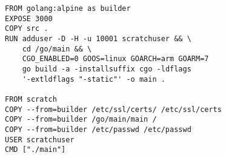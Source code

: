 \lstset{
numbers=left, 
basicstyle=\footnotesize,
frame = single, 
language=Pascal, 
framexleftmargin=16pt,
xleftmargin=2.3cm,
}
\begin{lstlisting}[linewidth=13cm, caption={Dockerfile for Hello},label={lst:dockerfileHello}]
FROM golang:alpine as builder
EXPOSE 3000
COPY src .
RUN adduser -D -H -u 10001 scratchuser && \
    cd /go/main && \
    CGO_ENABLED=0 GOOS=linux GOARCH=arm GOARM=7 
    go build -a -installsuffix cgo -ldflags 
    '-extldflags "-static"' -o main .

FROM scratch
COPY --from=builder /etc/ssl/certs/ /etc/ssl/certs
COPY --from=builder /go/main/main /
COPY --from=builder /etc/passwd /etc/passwd
USER scratchuser
CMD ["./main"]
\end{lstlisting}